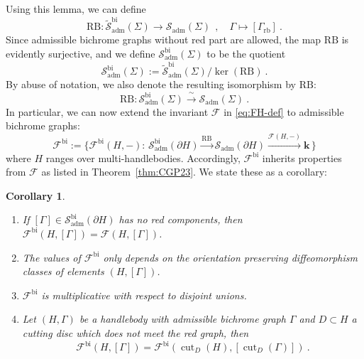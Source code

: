 \documentclass[11pt]{amsart}
\newtheorem{cor}[thm]{Corollary}
\theoremstyle{definition}
\numberwithin{equation}{section}
\def\bd{{\partial}}
\def\adm{\operatorname{adm}}
\def\cgpt{\mathscr{F}}
\def\cut{{\operatorname{cut}}}
\def\sk{\cS}
\def\cS{\mathcal{S}}
\def\kk{{\bm{k}}}
\def\to{\rightarrow}
\begin{document}
Using this lemma, we can define
\begin{equation}
   \mathrm{RB} : \tilde{\sk}^{\mathrm{bi}}_{\adm}(\Sigma) \to \sk_{\adm}(\Sigma)
   ~~ , \quad
   \Gamma \mapsto [\Gamma_\mathrm{rb}] \ .
\end{equation}
Since admissible bichrome graphs without red part are allowed, the map $\mathrm{RB}$ is evidently surjective, and we define $\sk^{\mathrm{bi}}_{\adm}(\Sigma)$ to be the quotient
\begin{equation}
    \sk^{\mathrm{bi}}_{\adm}(\Sigma) := 
    \tilde{\sk}^{\mathrm{bi}}_{\adm}(\Sigma) / \ker( \mathrm{RB} ) \ .
\end{equation}
By abuse of notation, we also denote the resulting isomorphism by $\mathrm{RB}$:
\begin{equation}
   \mathrm{RB} : \sk^{\mathrm{bi}}_{\adm}(\Sigma) \xrightarrow{~\sim~} \sk_{\adm}(\Sigma) \ .
\end{equation}
In particular, we can now extend the invariant $\cgpt$ in \eqref{eq:FH-def} to admissible bichrome graphs:
\begin{equation}
    \cgpt^\mathrm{bi} := \{
    \cgpt^\mathrm{bi}(H, -):  \, \sk^{\mathrm{bi}}_{\adm}(\bd H) \xrightarrow{\mathrm{RB}} \sk_{\adm}(\bd H)
    \xrightarrow{\cgpt(H, -)}
    \kk \, \}
\end{equation}
where $H$ ranges over multi-handlebodies.
Accordingly, $\cgpt^\mathrm{bi}$ inherits properties from $\cgpt$ as listed in Theorem~\ref{thm:CGP23}. We state these as a corollary:

\begin{cor}\label{cor:F-H-bi-properties}
\ 
\begin{enumerate}
\item If $[\Gamma] \in \sk^{\mathrm{bi}}_{\adm}(\bd H)$ has no red components, then $\cgpt^\mathrm{bi}(H, [\Gamma]) = \cgpt(H, [\Gamma])$.

\item The values of $\cgpt^\mathrm{bi}$ only depends on the orientation preserving diffeomorphism classes of elements $(H,[\Gamma])$.

\item $\cgpt^\mathrm{bi}$ is multiplicative with respect to disjoint unions. 

\item Let $(H,\Gamma)$ be a handlebody with admissible bichrome graph $\Gamma$ and $D \subset H$ a cutting disc which does not meet the red graph, then 
\begin{equation*}
\cgpt^\mathrm{bi}(H, [\Gamma] ) =
\cgpt^\mathrm{bi}(\cut_D(H), [\cut_D(\Gamma)] )\ .
\end{equation*}
\end{enumerate}
\end{cor}
\end{document}
